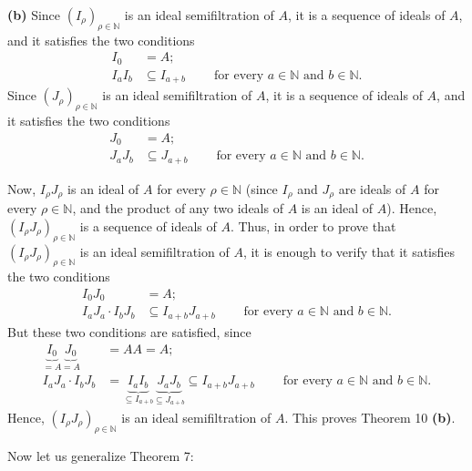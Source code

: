 \documentclass[12pt,final,notitlepage,onecolumn]{article}%
\begin{document}
\textbf{(b)} Since $\left(  I_{\rho}\right)  _{\rho\in\mathbb{N}}$ is an ideal
semifiltration of $A$, it is a sequence of ideals of $A$, and it satisfies the
two conditions%
\begin{align*}
I_{0}  &  =A;\\
I_{a}I_{b}  &  \subseteq I_{a+b}\ \ \ \ \ \ \ \ \ \ \text{for every }%
a\in\mathbb{N}\text{ and }b\in\mathbb{N}.
\end{align*}
Since $\left(  J_{\rho}\right)  _{\rho\in\mathbb{N}}$ is an ideal
semifiltration of $A$, it is a sequence of ideals of $A$, and it satisfies the
two conditions%
\begin{align*}
J_{0}  &  =A;\\
J_{a}J_{b}  &  \subseteq J_{a+b}\ \ \ \ \ \ \ \ \ \ \text{for every }%
a\in\mathbb{N}\text{ and }b\in\mathbb{N}.
\end{align*}


Now, $I_{\rho}J_{\rho}$ is an ideal of $A$ for every $\rho\in\mathbb{N}$
(since $I_{\rho}$ and $J_{\rho}$ are ideals of $A$ for every $\rho
\in\mathbb{N}$, and the product of any two ideals of $A$ is an ideal of $A$).
Hence, $\left(  I_{\rho}J_{\rho}\right)  _{\rho\in\mathbb{N}}$ is a sequence
of ideals of $A$. Thus, in order to prove that $\left(  I_{\rho}J_{\rho
}\right)  _{\rho\in\mathbb{N}}$ is an ideal semifiltration of $A$, it is
enough to verify that it satisfies the two conditions%
\begin{align*}
I_{0}J_{0}  &  =A;\\
I_{a}J_{a}\cdot I_{b}J_{b}  &  \subseteq I_{a+b}J_{a+b}%
\ \ \ \ \ \ \ \ \ \ \text{for every }a\in\mathbb{N}\text{ and }b\in\mathbb{N}.
\end{align*}
But these two conditions are satisfied, since%
\begin{align*}
\underbrace{I_{0}}_{=A}\underbrace{J_{0}}_{=A}  &  =AA=A;\\
I_{a}J_{a}\cdot I_{b}J_{b}  &  =\underbrace{I_{a}I_{b}}_{\subseteq I_{a+b}%
}\underbrace{J_{a}J_{b}}_{\subseteq J_{a+b}}\subseteq I_{a+b}J_{a+b}%
\ \ \ \ \ \ \ \ \ \ \text{for every }a\in\mathbb{N}\text{ and }b\in\mathbb{N}.
\end{align*}
Hence, $\left(  I_{\rho}J_{\rho}\right)  _{\rho\in\mathbb{N}}$ is an ideal
semifiltration of $A$. This proves Theorem 10 \textbf{(b)}.

Now let us generalize Theorem 7:
\end{document}
